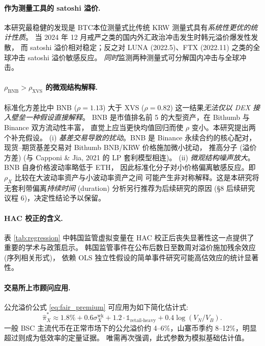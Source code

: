 \documentclass[11pt,a4paper]{article}
\begin{document}
\paragraph{作为测量工具的 satoshi 溢价.}
本研究最稳健的发现是 BTC本位测量式比传统 KRW 测量式具有\emph{系统性更优的统计性质}。
当 2024 年 12 月戒严之类的国内外汇政治冲击发生时韩元溢价爆发性发散，
而 satoshi 溢价相对稳定；反之对 LUNA (2022.5)、FTX (2022.11) 之类的全球冲击 satoshi 溢价敏感反应。
\emph{同时}监测两种测量式可分解国内冲击与全球冲击。

\paragraph{$\rho_{\text{BNB}}>\rho_{\text{XVS}}$ 的微观结构解释.}
标准化方差比中 BNB ($\rho=1.13$) 大于 XVS ($\rho=0.82$) 这一结果\emph{无法仅以 DEX 接入壁垒一种假设直接解释}。
BNB 是市值排名前 5 的大型资产，在 Bithumb 与 Binance 双方流动性丰富，
直觉上应当更快均值回归而使 $\rho$ 变小。本研究提出两个补充假设。
(i) \emph{基差交易导致的扰动}。BNB 是 Binance 永续合约的核心配对，
现货--期货基差交易对 Bithumb BNB/KRW 价格施加微小扰动，
推高分子 (溢价方差) (与 Capponi \& Jia, 2021 的 LP 套利模型相连)。
(ii) \emph{微观结构噪声放大}。BNB 自身价格波动率略低于 ETH，
因此标准化分子对小价格偏离敏感反应。即 $\rho_X$ 比较在大波动率资产与小波动率资产之间
可能产生非对称解释。这是本研究将无套利带偏离\emph{持续时间} (duration) 分析另行推荐为后续研究的原因
(\S 8 后续研究议程 6)，决定性结论予以保留。

\paragraph{HAC 校正的含义.}
表 \ref{tab:regression} 中韩国监管虚拟变量在 HAC 校正后丧失显著性这一点提供了重要的学术与政策启示。
韩国监管事件在公布后数日至数周对溢价施加残余效应 (序列相关形式)，
依赖 OLS 独立性假设的简单事件研究可能高估效应的统计显著性。

\paragraph{交易所上市顾问应用.}
公允溢价公式 \eqref{eq:fair_premium} 可应用为如下简化估计式:
\begin{equation}
\hat{\pi}_X^* \approx 1.8\% + 0.6\sigma_X^{\text{wk}} + 1.2\cdot\mathbb{1}_{\text{retail-heavy}} + 0.4\log(V_N/V_B).
\end{equation}
一般 BSC 主流代币在正常市场下的公允溢价约 4--6\%，山寨币季约 8--12\%，明显超过则成为低效率的定量证据。
唯需再次强调，此式参数为模拟基础估计值。
\end{document}
